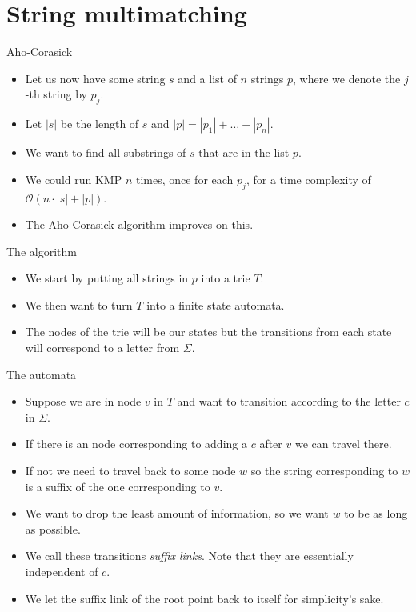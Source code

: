 \documentclass{beamer}
\begin{document}
	\section*{String multimatching}
	
	\begin{frame}[plain]{Aho-Corasick}
		\begin{itemize}
			\item Let us now have some string $s$ and a list of $n$ strings $p$, where we denote the $j$-th string by $p_j$.
			\item Let $|s|$ be the length of $s$ and $|p| = |p_1| + \dots + |p_n|$.
			\item We want to find all substrings of $s$ that are in the list $p$.
			\item We could run KMP $n$ times, once for each $p_j$, for a time complexity of $\mathcal{O}(n \cdot |s| + |p|)$.
			\item The Aho-Corasick algorithm improves on this.
		\end{itemize}
	\end{frame}
	
	\begin{frame}[plain]{The algorithm}
		\begin{itemize}
			\item We start by putting all strings in $p$ into a trie $T$.
			\item We then want to turn $T$ into a finite state automata.
			\item The nodes of the trie will be our states but the transitions from each state will correspond to a letter from $\Sigma$.
		\end{itemize}
	\end{frame}
	
	\begin{frame}[plain]{The automata}
		\begin{itemize}
			\item Suppose we are in node $v$ in $T$ and want to transition according to the letter $c$ in $\Sigma$.
			\item If there is an node corresponding to adding a $c$ after $v$ we can travel there.
			\item If not we need to travel back to some node $w$ so the string corresponding to $w$ is a suffix of the one corresponding to $v$.
			\item We want to drop the least amount of information, so we want $w$ to be as long as possible.
			\item We call these transitions \emph{suffix links}. Note that they are essentially independent of $c$.
			\item We let the suffix link of the root point back to itself for simplicity's sake.
		\end{itemize}
	\end{frame}
	
\end{document}
